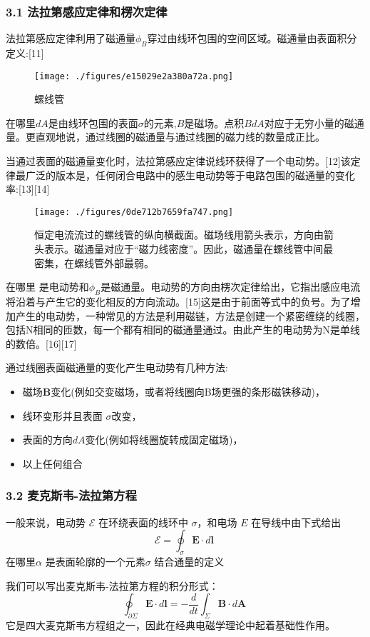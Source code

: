 \subsubsection{3.1 法拉第感应定律和楞次定律}
法拉第感应定律利用了磁通量$\phi_B$穿过由线环包围的空间区域。磁通量由表面积分定义:[11]
\begin{figure}[ht]
\centering
\texttt{[image: ./figures/e15029e2a380a72a.png]}
\caption{螺线管} \label{fig_DCGY_5}
\end{figure}
在哪里$dA$是由线环包围的表面$\sigma$的元素,$B$是磁场。点积$BdA$对应于无穷小量的磁通量。更直观地说，通过线圈的磁通量与通过线圈的磁力线的数量成正比。

当通过表面的磁通量变化时，法拉第感应定律说线环获得了一个电动势。[12]该定律最广泛的版本是，任何闭合电路中的感生电动势等于电路包围的磁通量的变化率:[13][14]
\begin{figure}[ht]
\centering
\texttt{[image: ./figures/0de712b7659fa747.png]}
\caption{恒定电流流过的螺线管的纵向横截面。磁场线用箭头表示，方向由箭头表示。磁通量对应于“磁力线密度”。因此，磁通量在螺线管中间最密集，在螺线管外部最弱。} \label{fig_DCGY_6}
\end{figure}
在哪里  是电动势和$\phi_B$是磁通量。电动势的方向由楞次定律给出，它指出感应电流将沿着与产生它的变化相反的方向流动。[15]这是由于前面等式中的负号。为了增加产生的电动势，一种常见的方法是利用磁链，方法是创建一个紧密缠绕的线圈，包括N相同的匝数，每一个都有相同的磁通量通过。由此产生的电动势为N是单线的数倍。[16][17]

通过线圈表面磁通量的变化产生电动势有几种方法:
\begin{itemize}
\item 磁场$\mathbf B$变化(例如交变磁场，或者将线圈向B场更强的条形磁铁移动)，
\item 线环变形并且表面 $\sigma$改变，
\item 表面的方向$dA$变化(例如将线圈旋转成固定磁场)，
\item 以上任何组合
\end{itemize}
\subsubsection{3.2 麦克斯韦-法拉第方程}
一般来说，电动势 $\mathcal{E}$ 在环绕表面的线环中 $\sigma$，和电场 $E$ 在导线中由下式给出
$$\mathcal{E} = \oint_{\sigma} \mathbf{E} \cdot d\mathbf{l}~$$
在哪里$\alpha$ 是表面轮廓的一个元素$\sigma$ 结合通量的定义

我们可以写出麦克斯韦-法拉第方程的积分形式：
$$\oint_{\partial \Sigma} \mathbf{E} \cdot d\mathbf{l} = -\frac{d}{dt} \int_{\Sigma} \mathbf{B} \cdot d\mathbf{A}~$$
它是四大麦克斯韦方程组之一，因此在经典电磁学理论中起着基础性作用。